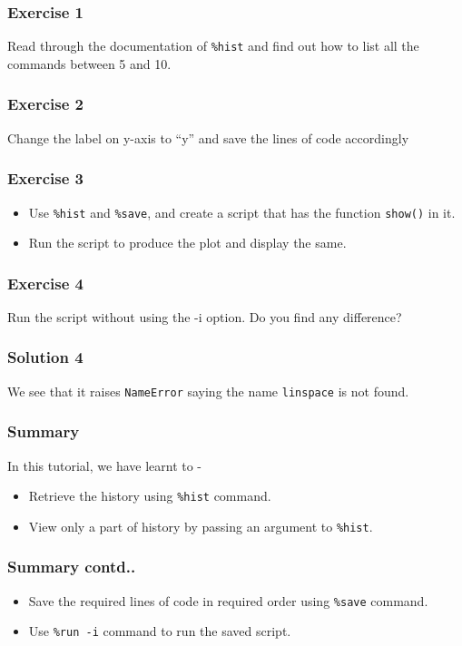 \documentclass[17pt,compress]{beamer}
\begin{document}
\begin{frame}
\frametitle{Exercise 1}
\label{sec-4}
Read through the documentation of \texttt{\%hist} and find out how to
list all the commands between 5 and 10.
\end{frame}
\begin{frame}
\frametitle{Exercise 2}
\label{sec-5}
Change the label on y-axis to ``y'' and save the lines of code
accordingly
\end{frame}
\begin{frame}
\frametitle{Exercise 3}
\label{sec-6}
\begin{itemize}
\item Use \texttt{\%hist} and \texttt{\%save}, and create a script that has the function
 \texttt{show()} in it. \pause
\item Run the script to produce the plot and display the same.
\end{itemize}
\end{frame}
\begin{frame}
\frametitle{Exercise 4}
\label{sec-7}
Run the script without using the -i option. Do you find any difference?
\end{frame}
\begin{frame}
\frametitle{Solution 4}
\label{sec-8}
We see that it raises \texttt{NameError} saying the name \texttt{linspace} is not
found.
\end{frame}
\begin{frame}
\frametitle{Summary}
In this tutorial, we have learnt to -
\label{sec-9.1}
\begin{itemize}
\item Retrieve the history using \texttt{\%hist} command.
\item View only a part of history by passing an argument to \texttt{\%hist}.\end{itemize}
\end{frame}
\begin{frame}
\frametitle{Summary contd..}
\label{sec-9.2}
\begin{itemize}
\item Save the required lines of code in required order using \texttt{\%save} command.
\item Use \texttt{\%run -i} command to run the saved script.
\end{itemize}
\end{frame}
\end{document}
